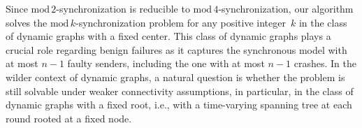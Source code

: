 \documentclass{article}
\begin{document}
Since $\mathrm{mod}\,2$-synchronization is reducible to $\mathrm{mod}\,4$-synchronization,
	 our algorithm solves the $\mathrm{mod}\,k$-synchronization problem for any positive integer~$k$
	 in the class of  dynamic  graphs with a fixed center.
This class of dynamic graphs plays a crucial role regarding benign failures as it captures 
	the synchronous model with at most $n-1$ faulty senders, including the one with at most $n-1$ crashes.
In the wilder context of dynamic graphs, a natural question is whether the problem is still solvable 
	under weaker connectivity assumptions, in particular, in the class of dynamic graphs with a fixed root, 
	i.e., with a time-varying spanning tree at each round rooted at a fixed node.

\printbibliography
\end{document}

